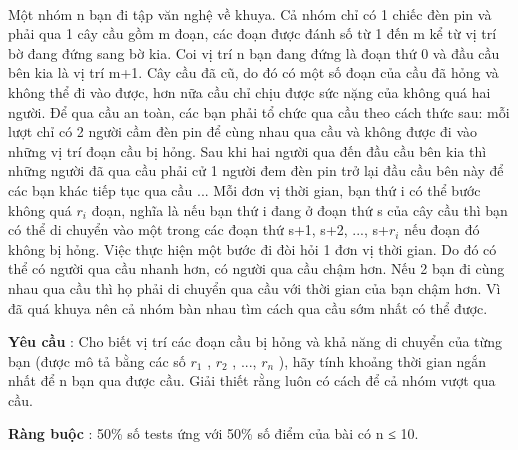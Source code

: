  

Một nhóm n bạn đi tập văn nghệ về khuya. Cả nhóm chỉ có 1 chiếc đèn pin và phải qua 1 cây cầu gồm m đoạn, các đoạn được đánh số từ 1 đến m kể từ vị trí bờ đang đứng sang bờ kia. Coi vị trí n bạn đang đứng là đoạn thứ 0 và đầu cầu bên kia là vị trí m+1. Cây cầu đã cũ, do đó có một số đoạn của cầu đã hỏng và không thể đi vào được, hơn nữa cầu chỉ chịu được sức nặng của không quá hai người. Để qua cầu an toàn, các bạn phải tổ chức qua cầu theo cách thức sau: mỗi lượt chỉ có 2 người cầm đèn pin để cùng nhau qua cầu và không được đi vào những vị trí đoạn cầu bị hỏng. Sau khi hai người qua đến đầu cầu bên kia thì những người đã qua cầu phải cử 1 người đem đèn pin trở lại đầu cầu bên này để các bạn khác tiếp tục qua cầu ... Mỗi đơn vị thời gian, bạn thứ i có thể bước không quá $r_{i}$ đoạn, nghĩa là nếu bạn thứ i đang ở đoạn thứ s của cây cầu thì bạn có thể di chuyển vào một trong các đoạn thứ s+1, s+2, ..., s+$r_{i}$ nếu đoạn đó không bị hỏng. Việc thực hiện một bước đi đòi hỏi 1 đơn vị thời gian. Do đó có thể có người qua cầu nhanh hơn, có người qua cầu chậm hơn. Nếu 2 bạn đi cùng nhau qua cầu thì họ phải di chuyển qua cầu với thời gian của bạn chậm hơn. Vì đã quá khuya nên cả nhóm bàn nhau tìm cách qua cầu sớm nhất có thể được.

\textbf{Yêu cầu } : Cho biết vị trí các đoạn cầu bị hỏng và khả năng di chuyển của từng bạn (được mô tả bằng các số $r_{1}$ , $r_{2}$ , ..., $r_{n}$ ), hãy tính khoảng thời gian ngắn nhất để n bạn qua được cầu. Giải thiết rằng luôn có cách để cả nhóm vượt qua cầu.

\textbf{Ràng buộc } : 50\% số tests ứng với 50\% số điểm của bài có n ≤ 10.